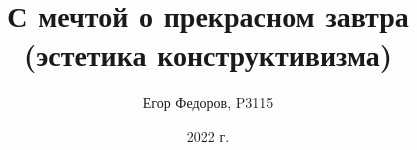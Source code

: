 \usepackage{fontspec}
\usepackage{microtype}
\usepackage[english,main=russian]{babel}
\setmainfont{VKHUTETYPE} %
\setsansfont{Helvetica}
\setmonofont{VKHUTETYPE}
\usepackage[T2A]{fontenc}
\usepackage[utf8]{inputenc}
\renewcommand{\thefigure}{\arabic{figure}}

\usepackage{ifthen}
\usepackage[absolute,overlay]{textpos}

\usepackage{caption}
\usepackage{subcaption}
\usepackage{wrapfig}

\title{С мечтой о прекрасном завтра \\ (эстетика конструктивизма)}
\author{Егор Федоров, P3115}

\date{2022 г.}